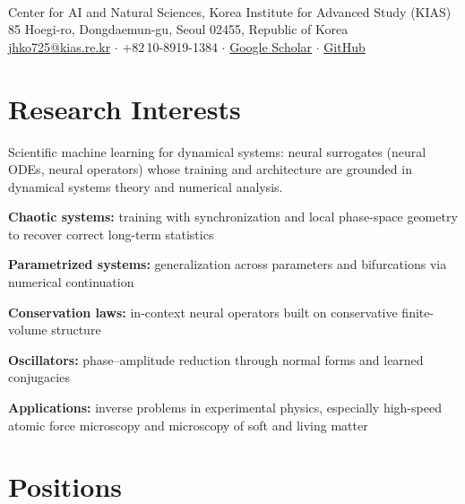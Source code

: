 
\begin{center}
  \\[0.5em]
  Center for AI and Natural Sciences, Korea Institute for Advanced Study (KIAS)\\
  85 Hoegi-ro, Dongdaemun-gu, Seoul 02455, Republic of Korea\\[0.35em]
  \href{mailto:jhko725@kias.re.kr}{jhko725@kias.re.kr} \enspace$\cdot$\enspace
  +82\,10-8919-1384 \enspace$\cdot$\enspace
  \href{https://scholar.google.com/citations?user=t7lTWNQAAAAJ&hl=en}{Google Scholar} \enspace$\cdot$\enspace
  \href{https://github.com/Jhko725}{GitHub}
\end{center}

\section{Research Interests}
Scientific machine learning for dynamical systems: neural surrogates (neural ODEs, neural operators) whose training and architecture are grounded in dynamical systems theory and numerical analysis.
\begin{interests}
  \item \textbf{Chaotic systems:} training with synchronization and local phase-space geometry to recover correct long-term statistics
  \item \textbf{Parametrized systems:} generalization across parameters and bifurcations via numerical continuation
  \item \textbf{Conservation laws:} in-context neural operators built on conservative finite-volume structure
  \item \textbf{Oscillators:} phase--amplitude reduction through normal forms and learned conjugacies
  \item \textbf{Applications:} inverse problems in experimental physics, especially high-speed atomic force microscopy and microscopy of soft and living matter
\end{interests}

\section{Positions}

